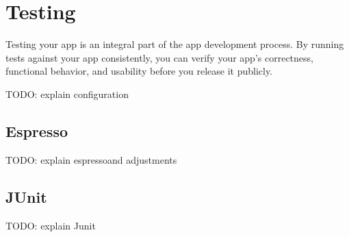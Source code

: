 \section{Testing}

Testing your app is an integral part of the app development process. By running tests against your app consistently, you can verify your app's correctness, functional behavior, and usability before you release it publicly.

TODO: explain configuration

\subsection{Espresso}
TODO: explain espressoand adjustments


\subsection{JUnit}
TODO: explain Junit 




